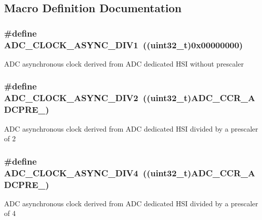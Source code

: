\subsection{Macro Definition Documentation}
\hypertarget{group___a_d_c___clock_prescaler_ga092c0277fd6db9b905d229c9f8dda8ab}{
\subsubsection[{A\-D\-C\-\_\-\-C\-L\-O\-C\-K\-\_\-\-A\-S\-Y\-N\-C\-\_\-\-D\-I\-V1}]{\setlength{\rightskip}{0pt plus 5cm}\#define A\-D\-C\-\_\-\-C\-L\-O\-C\-K\-\_\-\-A\-S\-Y\-N\-C\-\_\-\-D\-I\-V1~((uint32\-\_\-t)0x00000000)}}\label{group___a_d_c___clock_prescaler_ga092c0277fd6db9b905d229c9f8dda8ab}
A\-D\-C asynchronous clock derived from A\-D\-C dedicated H\-S\-I without prescaler \hypertarget{group___a_d_c___clock_prescaler_gacf4ae9c70dd75168acf17fbce10af8b8}{
\subsubsection[{A\-D\-C\-\_\-\-C\-L\-O\-C\-K\-\_\-\-A\-S\-Y\-N\-C\-\_\-\-D\-I\-V2}]{\setlength{\rightskip}{0pt plus 5cm}\#define A\-D\-C\-\_\-\-C\-L\-O\-C\-K\-\_\-\-A\-S\-Y\-N\-C\-\_\-\-D\-I\-V2~((uint32\-\_\-t){\bf A\-D\-C\-\_\-\-C\-C\-R\-\_\-\-A\-D\-C\-P\-R\-E\-\_})}}\label{group___a_d_c___clock_prescaler_gacf4ae9c70dd75168acf17fbce10af8b8}
A\-D\-C asynchronous clock derived from A\-D\-C dedicated H\-S\-I divided by a prescaler of 2 \hypertarget{group___a_d_c___clock_prescaler_ga5fb738b8222dfdbceb02a0ad041f5da5}{
\subsubsection[{A\-D\-C\-\_\-\-C\-L\-O\-C\-K\-\_\-\-A\-S\-Y\-N\-C\-\_\-\-D\-I\-V4}]{\setlength{\rightskip}{0pt plus 5cm}\#define A\-D\-C\-\_\-\-C\-L\-O\-C\-K\-\_\-\-A\-S\-Y\-N\-C\-\_\-\-D\-I\-V4~((uint32\-\_\-t){\bf A\-D\-C\-\_\-\-C\-C\-R\-\_\-\-A\-D\-C\-P\-R\-E\-\_})}}\label{group___a_d_c___clock_prescaler_ga5fb738b8222dfdbceb02a0ad041f5da5}
A\-D\-C asynchronous clock derived from A\-D\-C dedicated H\-S\-I divided by a prescaler of 4 